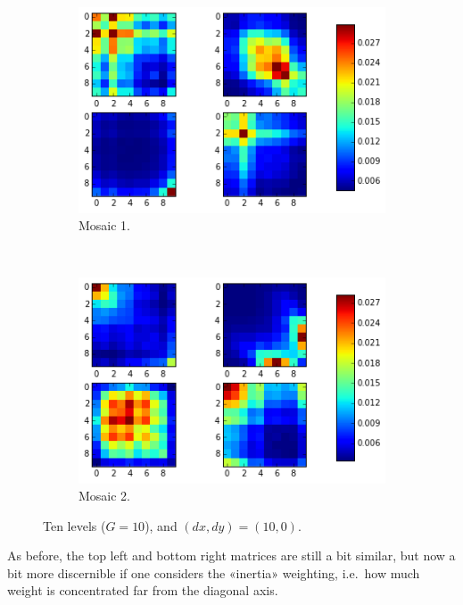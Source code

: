 \documentclass[a4paper]{article}
\begin{document}
\begin{figure}
    \centering
    \begin{subfigure}[b]{0.40\textwidth}
        \centering
        \includegraphics[width=\textwidth]{m1_10_0.png}
        \caption{%
            Mosaic 1.
        }
    \end{subfigure}
    ~
    \begin{subfigure}[b]{0.40\textwidth}
        \centering
        \includegraphics[width=\textwidth]{m2_10_0.png}
        \caption{%
            Mosaic 2.
        }
    \end{subfigure}
    \caption{%
        Ten levels ($G = 10$), and $(dx, dy) = (10, 0)$.
    }
    \label{fig:glcm10_10_0}
\end{figure}

As before, the top left and bottom right matrices are still a bit
similar, but now a bit more discernible if one considers the «inertia»
weighting, i.e.\ how much weight is concentrated far from the diagonal
axis.
\end{document}
